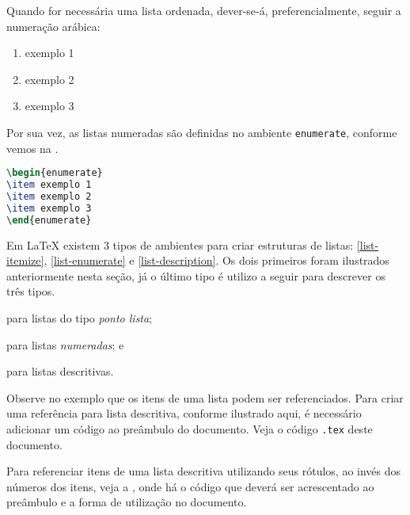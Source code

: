 \documentclass[portuguese]{textolivre}
\begin{document}
\lipsum[2]

Quando for necessária uma lista ordenada, dever-se-á, preferencialmente, seguir a numeração arábica:
\begin{enumerate}
\item exemplo 1
\item exemplo 2
\item exemplo 3
\end{enumerate}
Por sua vez, as listas numeradas são definidas no ambiente \verb|enumerate|, conforme vemos na .
\begin{lstlisting}[language=tex, label=lst-enum, caption={Listas numeradas.},float]
\begin{enumerate}
\item exemplo 1
\item exemplo 2
\item exemplo 3
\end{enumerate}
\end{lstlisting} %

\lipsum[3]

Em \LaTeX{} existem 3 tipos de ambientes para criar estruturas de listas: \ref{list-itemize}, \ref{list-enumerate} e \ref{list-description}.
Os dois primeiros foram ilustrados anteriormente nesta seção, já o último tipo é
utilizo a seguir para descrever os três tipos.
\begin{description}[topsep=1ex,partopsep=1ex]
  \item[itemize\label{list-itemize}] para listas do tipo \emph{ponto lista};
  \item[enumerate\label{list-enumerate}] para listas \emph{numeradas}; e
  \item[description\label{list-description}] para listas descritivas.
\end{description}
Observe no exemplo que os itens de uma lista podem ser referenciados. Para criar uma referência para lista descritiva,
conforme ilustrado aqui, é necessário adicionar um código ao preâmbulo do documento. Veja o código \texttt{.tex} deste documento.

Para referenciar itens de uma lista descritiva utilizando seus rótulos, ao invés dos números dos itens, 
veja a , onde há o código que deverá ser acrescentado ao preâmbulo e a forma de utilização no documento.
\end{document}
